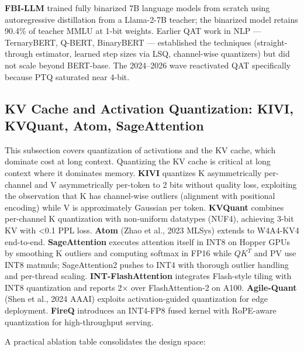 \documentclass{article}
\begin{document}
\textbf{FBI-LLM} \citep{ma20242024} trained fully binarized 7B language models from scratch using autoregressive distillation from a Llama-2-7B teacher; the binarized model retains 90.4\% of teacher MMLU at 1-bit weights. Earlier QAT work in NLP --- TernaryBERT, Q-BERT, BinaryBERT --- established the techniques (straight-through estimator, learned step sizes via LSQ, channel-wise quantizers) but did not scale beyond BERT-base. The 2024--2026 wave reactivated QAT specifically because PTQ saturated near 4-bit.

\subsection{KV Cache and Activation Quantization: KIVI, KVQuant, Atom, SageAttention}\label{kv-cache-and-activation-quantization-kivi-kvquant-atom-sageattention}

This subsection covers quantization of activations and the KV cache, which dominate cost at long context. Quantizing the KV cache is critical at long context where it dominates memory. \textbf{KIVI} quantizes K asymmetrically per-channel and V asymmetrically per-token to 2 bits without quality loss, exploiting the observation that K has channel-wise outliers (alignment with positional encoding) while V is approximately Gaussian per token. \textbf{KVQuant} combines per-channel K quantization with non-uniform datatypes (NUF4), achieving 3-bit KV with \textless0.1 PPL loss. \textbf{Atom} (Zhao et al., 2023 MLSys) extends to W4A4-KV4 end-to-end. \textbf{SageAttention} \citep{zhang20242024} executes attention itself in INT8 on Hopper GPUs by smoothing K outliers and computing softmax in FP16 while \(QK^T\) and PV use INT8 matmuls; SageAttention2 pushes to INT4 with thorough outlier handling and per-thread scaling. \textbf{INT-FlashAttention} \citep{chen20242024} integrates Flash-style tiling with INT8 quantization and reports 2× over FlashAttention-2 on A100. \textbf{Agile-Quant} (Shen et al., 2024 AAAI) exploits activation-guided quantization for edge deployment. \textbf{FireQ} \citep{baek20252025} introduces an INT4-FP8 fused kernel with RoPE-aware quantization for high-throughput serving.

A practical ablation table consolidates the design space:
\end{document}

